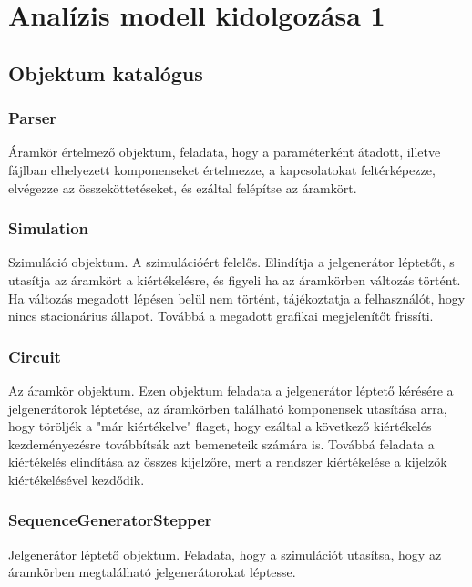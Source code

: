 %
\chapter{Analízis modell kidolgozása 1}

\thispagestyle{fancy}

\section{Objektum katalógus}

\subsection{\bf Parser}
Áramkör értelmező objektum, feladata, hogy a paraméterként átadott, illetve fájlban elhelyezett komponenseket értelmezze, a kapcsolatokat feltérképezze, elvégezze az összeköttetéseket, és ezáltal felépítse az áramkört.

\subsection{\bf Simulation}
Szimuláció objektum. A szimulációért felelős. Elindítja a jelgenerátor léptetőt, s utasítja az áramkört a kiértékelésre, és figyeli ha az áramkörben változás történt. Ha változás megadott lépésen belül nem történt, tájékoztatja a felhasználót, hogy nincs stacionárius állapot. Továbbá a megadott grafikai megjelenítőt frissíti.

\subsection{\bf Circuit}
Az áramkör objektum. Ezen objektum feladata a jelgenerátor léptető kérésére a jelgenerátorok léptetése, az áramkörben található komponensek utasítása arra, hogy töröljék a "már kiértékelve" flaget, hogy ezáltal a következő kiértékelés kezdeményezésre továbbítsák azt bemeneteik számára is.
Továbbá feladata a kiértékelés elindítása az összes kijelzőre, mert a rendszer kiértékelése a kijelzők kiértékelésével kezdődik.


\subsection{\bf SequenceGeneratorStepper}
Jelgenerátor léptető objektum. Feladata, hogy a szimulációt utasítsa, hogy az áramkörben megtalálható jelgenerátorokat léptesse.

